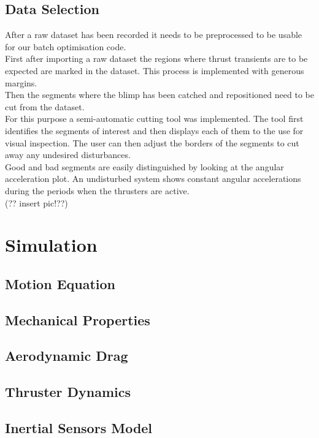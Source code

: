 \subsection{Data Selection}
\label{sub:data_selection}
After a raw dataset has been recorded it needs to be preprocessed to be usable for our batch optimisation code.\\
First after importing a raw dataset the regions where thrust transients are to be expected are marked in the dataset.
This process is implemented with generous margins. \\
Then the segments where the blimp has been catched and repositioned need to be cut from the dataset. \\
For this purpose a semi-automatic cutting tool was implemented. 
The tool first identifies the segments of interest and then displays each of them to the use for visual inspection.
The user can then adjust the borders of the segments to cut away any undesired disturbances. \\
Good and bad segments are easily distinguished by looking at the angular acceleration plot.
An undisturbed system shows constant angular accelerations during the periods when the thrusters are active. \\

(?? insert pic!??)

\section{Simulation}
\label{sec:simulation}

\subsection{Motion Equation}
\label{sub:motion_equation}

\subsection{Mechanical Properties}
\label{sub:mech_properties}

\subsection{Aerodynamic Drag}
\label{sub:aero_drag}

\subsection{Thruster Dynamics}
\label{sub:thrust_dynamics}

\subsection{Inertial Sensors Model}
\label{sub:imu_model}

